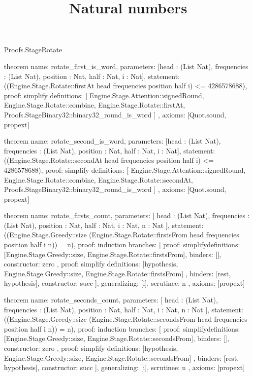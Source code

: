 \begin{lexlean}{Proofs.StageRotate}
\title{Natural numbers}
\begin{semanticmodule}
theorem{
  name: rotate_first_is_word,
  parameters: [head : (List Nat), frequencies : (List Nat), position : Nat, half : Nat, i : Nat],
  statement: ((Engine.Stage.Rotate::firstAt head frequencies position half i) <= 4286578688),
  proof: simplify{
    definitions: [
      Engine.Stage.Attention::signedRound,
      Engine.Stage.Rotate::combine,
      Engine.Stage.Rotate::firstAt,
      Proofs.StageBinary32::binary32_round_is_word
    ]
  },
  axioms: [Quot.sound, propext]
}

theorem{
  name: rotate_second_is_word,
  parameters: [head : (List Nat), frequencies : (List Nat), position : Nat, half : Nat, i : Nat],
  statement: ((Engine.Stage.Rotate::secondAt head frequencies position half i) <= 4286578688),
  proof: simplify{
    definitions: [
      Engine.Stage.Attention::signedRound,
      Engine.Stage.Rotate::combine,
      Engine.Stage.Rotate::secondAt,
      Proofs.StageBinary32::binary32_round_is_word
    ]
  },
  axioms: [Quot.sound, propext]
}

theorem{
  name: rotate_firsts_count,
  parameters: [
    head : (List Nat),
    frequencies : (List Nat),
    position : Nat,
    half : Nat,
    i : Nat,
    n : Nat
  ],
  statement: ((Engine.Stage.Greedy::size (Engine.Stage.Rotate::firstsFrom head frequencies position half i n)) = n),
  proof: induction{
    branches: [
      {
        proof: simplify{definitions: [Engine.Stage.Greedy::size, Engine.Stage.Rotate::firstsFrom]},
        binders: [],
        constructor: zero
      },
      {
        proof: simplify{
          definitions: [hypothesis, Engine.Stage.Greedy::size, Engine.Stage.Rotate::firstsFrom]
        },
        binders: [rest, hypothesis],
        constructor: succ
      }
    ],
    generalizing: [i],
    scrutinee: n
  },
  axioms: [propext]
}

theorem{
  name: rotate_seconds_count,
  parameters: [
    head : (List Nat),
    frequencies : (List Nat),
    position : Nat,
    half : Nat,
    i : Nat,
    n : Nat
  ],
  statement: ((Engine.Stage.Greedy::size (Engine.Stage.Rotate::secondsFrom head frequencies position half i n)) = n),
  proof: induction{
    branches: [
      {
        proof: simplify{definitions: [Engine.Stage.Greedy::size, Engine.Stage.Rotate::secondsFrom]},
        binders: [],
        constructor: zero
      },
      {
        proof: simplify{
          definitions: [hypothesis, Engine.Stage.Greedy::size, Engine.Stage.Rotate::secondsFrom]
        },
        binders: [rest, hypothesis],
        constructor: succ
      }
    ],
    generalizing: [i],
    scrutinee: n
  },
  axioms: [propext]
}


\end{semanticmodule}
\end{lexlean}
